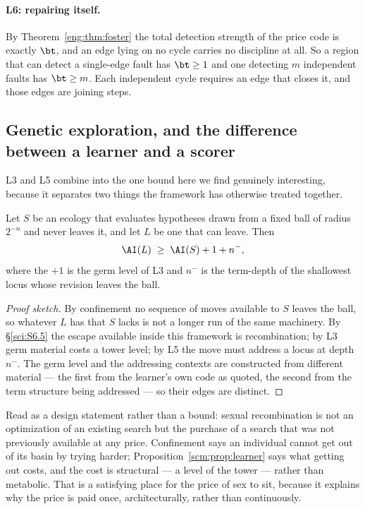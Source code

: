 \paragraph{L6: repairing itself.}
By Theorem~\ref{eng:thm:foster} the total detection strength of the price
code is exactly $\bt$, and an edge lying on no cycle carries no discipline
at all. So a region that can detect a single-edge fault has $\bt \ge 1$
and one detecting $m$ independent faults has $\bt \ge m$. Each independent
cycle requires an edge that closes it, and those edges are joining steps.

\subsection{Genetic exploration, and the difference between a learner and
a scorer}
\label{scm:sec:learner}

L3 and L5 combine into the one bound here we find genuinely interesting,
because it separates two things the framework has otherwise treated
together.

\begin{proposition}
\label{scm:prop:learner}
Let $S$ be an ecology that evaluates hypotheses drawn from a fixed ball of
radius $2^{-n}$ and never leaves it, and let $L$ be one that can leave.
Then
\[
  \AI(L) \;\ge\; \AI(S) + 1 + n^{-},
\]
where the $+1$ is the germ level of L3 and $n^{-}$ is the term-depth of
the shallowest locus whose revision leaves the ball.
\end{proposition}

\begin{proof}[Proof sketch]
By confinement no sequence of moves available to $S$ leaves the ball, so
whatever $L$ has that $S$ lacks is not a longer run of the same machinery.
By \S\ref{sci:S6.5} the escape available inside this framework is
recombination; by L3 germ material costs a tower level; by L5 the move
must address a locus at depth $n^{-}$. The germ level and the addressing
contexts are constructed from different material --- the first from the
learner's own code as quoted, the second from the term structure being
addressed --- so their edges are distinct.
\end{proof}

\begin{remark}
\label{scm:rmk:genetic}
Read as a design statement rather than a bound: sexual recombination is
not an optimization of an existing search but the purchase of a search
that was not previously available at any price. Confinement says an
individual cannot get out of its basin by trying harder;
Proposition~\ref{scm:prop:learner} says what getting out costs, and the
cost is structural --- a level of the tower --- rather than metabolic.
That is a satisfying place for the price of sex to sit, because it
explains why the price is paid once, architecturally, rather than
continuously.
\end{remark}

